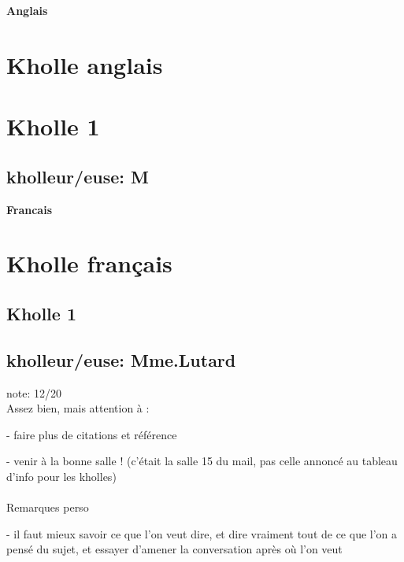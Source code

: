 \documentclass{article}
\begin{document}
\vspace{5mm}

\begin{center}
\textbf{\large Anglais}
\end{center} \vspace{0.2cm}

\section{Kholle anglais}

\section{Kholle 1}
\subsection{kholleur/euse: M}


\begin{center}
\textbf{\large Francais}
\end{center} \vspace{0.2cm}

\section{Kholle français}

\subsection{Kholle 1}
\subsection{kholleur/euse: Mme.Lutard}

note: 12/20 \\

Assez bien, mais attention à :

- faire plus de citations et référence

- venir à la bonne salle ! (c'était la salle 15 du mail, pas celle annoncé au tableau d'info pour les kholles) \\ \\
Remarques perso

- il faut mieux savoir ce que l'on veut dire, et dire vraiment tout de ce que l'on a pensé du sujet, et essayer d'amener la conversation après où l'on veut
\end{document}
